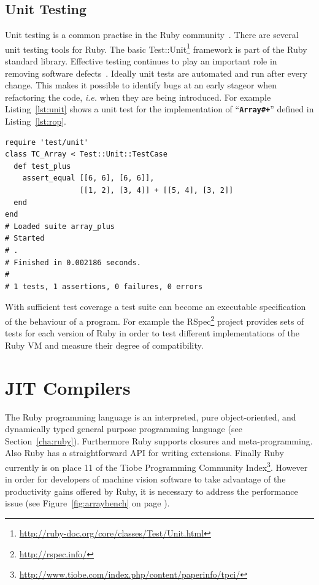 \documentclass[12pt,a4paper,oneside,openright]{book}
\newcommand{\Eg}{For example }
\newcommand{\ie}{\emph{i.e.} }
\newcommand{\sct}[1]{Section~\ref{cha:#1}}
\newcommand{\fig}[1]{Figure~\ref{fig:#1}}
\newcommand{\lst}[1]{Listing~\ref{lst:#1}}
\newcommand{\code}[1]{``\texttt{\textbf{\textcolor{codegray}{\small{#1}}}}''}
\begin{document}
\begin{CJK}{UTF8}{}
\subsection{Unit Testing}\label{cha:unittesting}
Unit testing is a common practise in the Ruby community~\citep{martin2009}. There are several unit testing tools for Ruby. The basic Test::Unit\footnote{\url{http://ruby-doc.org/core/classes/Test/Unit.html}} framework is part of the Ruby standard library. Effective testing continues to play an important role in removing software defects~\citep{unittest}. Ideally unit tests are automated and run after every change. This makes it possible to identify bugs at an early stageor when refactoring the code, \ie when they are being introduced. \Eg \lst{unit} shows a unit test for the implementation of \code{Array\#+} defined in \lst{rop}.
\lstset{language=Ruby,frame=single,numbers=none}
\begin{lstlisting}[float=htbp,caption={Unit test for \code{Array\#+} defined in \lst{rop}},label=lst:unit]
require 'test/unit'
class TC_Array < Test::Unit::TestCase
  def test_plus
    assert_equal [[6, 6], [6, 6]], 
                 [[1, 2], [3, 4]] + [[5, 4], [3, 2]]
  end
end
# Loaded suite array_plus
# Started
# .
# Finished in 0.002186 seconds.
#
# 1 tests, 1 assertions, 0 failures, 0 errors
\end{lstlisting}

With sufficient test coverage a test suite can become an executable specification of the behaviour of a program. \Eg the RSpec\footnote{\url{http://rspec.info/}} project provides sets of tests for each version of Ruby in order to test different implementations of the Ruby \ac{VM} and measure their degree of compatibility.

\section{\acs{JIT} Compilers}\label{cha:jits}
The Ruby programming language is an interpreted, pure object-oriented, and dynamically typed general purpose programming language (see \sct{ruby}). Furthermore Ruby supports closures and meta-programming. Also Ruby has a straightforward \ac{API} for writing extensions. Finally Ruby currently is on place 11 of the Tiobe Programming Community Index\footnote{\url{http://www.tiobe.com/index.php/content/paperinfo/tpci/}}. However in order for developers of machine vision software to take advantage of the productivity gains offered by Ruby, it is necessary to address the performance issue (see \fig{arraybench} on page \pageref{fig:arraybench}).


\end{CJK}
\end{document}
